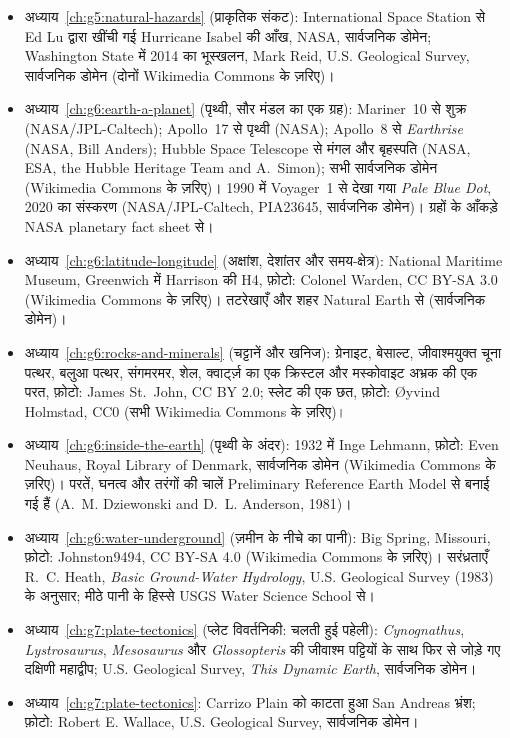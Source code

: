 \begin{itemize}
  \item अध्याय~\ref{ch:g5:natural-hazards} (प्राकृतिक संकट): International Space Station से Ed Lu द्वारा खींची गई Hurricane Isabel की आँख, NASA, सार्वजनिक डोमेन; Washington State में 2014 का भूस्खलन, Mark Reid, U.S. Geological Survey, सार्वजनिक डोमेन (दोनों Wikimedia Commons के ज़रिए)।
  \item अध्याय~\ref{ch:g6:earth-a-planet} (पृथ्वी, सौर मंडल का एक ग्रह): Mariner~10 से शुक्र (NASA/JPL-Caltech); Apollo~17 से पृथ्वी (NASA); Apollo~8 से \emph{Earthrise} (NASA, Bill Anders); Hubble Space Telescope से मंगल और बृहस्पति (NASA, ESA, the Hubble Heritage Team and A.~Simon); सभी सार्वजनिक डोमेन (Wikimedia Commons के ज़रिए)। 1990 में Voyager~1 से देखा गया \emph{Pale Blue Dot}, 2020 का संस्करण (NASA/JPL-Caltech, PIA23645, सार्वजनिक डोमेन)। ग्रहों के आँकड़े NASA planetary fact sheet से।
  \item अध्याय~\ref{ch:g6:latitude-longitude} (अक्षांश, देशांतर और समय-क्षेत्र): National Maritime Museum, Greenwich में Harrison की H4, फ़ोटो: Colonel Warden, CC BY-SA 3.0 (Wikimedia Commons के ज़रिए)। तटरेखाएँ और शहर Natural Earth से (सार्वजनिक डोमेन)।
  \item अध्याय~\ref{ch:g6:rocks-and-minerals} (चट्टानें और खनिज): ग्रेनाइट, बेसाल्ट, जीवाश्मयुक्त चूना पत्थर, बलुआ पत्थर, संगमरमर, शेल, क्वार्ट्ज़ का एक क्रिस्टल और मस्कोवाइट अभ्रक की एक परत, फ़ोटो: James St.~John, CC BY 2.0; स्लेट की एक छत, फ़ोटो: Øyvind Holmstad, CC0 (सभी Wikimedia Commons के ज़रिए)।
  \item अध्याय~\ref{ch:g6:inside-the-earth} (पृथ्वी के अंदर): 1932 में Inge Lehmann, फ़ोटो: Even Neuhaus, Royal Library of Denmark, सार्वजनिक डोमेन (Wikimedia Commons के ज़रिए)। परतें, घनत्व और तरंगों की चालें Preliminary Reference Earth Model से बनाई गई हैं (A.~M. Dziewonski and D.~L. Anderson, 1981)।
  \item अध्याय~\ref{ch:g6:water-underground} (ज़मीन के नीचे का पानी): Big Spring, Missouri, फ़ोटो: Johnston9494, CC BY-SA 4.0 (Wikimedia Commons के ज़रिए)। सरंध्रताएँ R.~C. Heath, \emph{Basic Ground-Water Hydrology}, U.S. Geological Survey (1983) के अनुसार; मीठे पानी के हिस्से USGS Water Science School से।
  \item अध्याय~\ref{ch:g7:plate-tectonics} (प्लेट विवर्तनिकी: चलती हुई पहेली): \emph{Cynognathus}, \emph{Lystrosaurus}, \emph{Mesosaurus} और \emph{Glossopteris} की जीवाश्म पट्टियों के साथ फिर से जोड़े गए दक्षिणी महाद्वीप; U.S. Geological Survey, \emph{This Dynamic Earth}, सार्वजनिक डोमेन।
  \item अध्याय~\ref{ch:g7:plate-tectonics}: Carrizo Plain को काटता हुआ San Andreas भ्रंश; फ़ोटो: Robert E. Wallace, U.S. Geological Survey, सार्वजनिक डोमेन।

\end{itemize}
